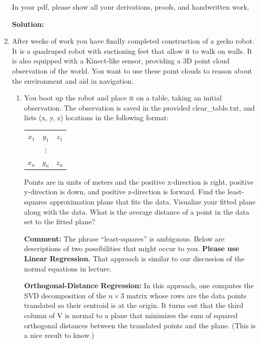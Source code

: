 \documentclass[conference,onecolumn]{IEEEtran}
\begin{document}
\begin{enumerate}[label=\arabic{enumi}.]
            In your pdf, please show all your derivations, proofs, and handwritten work.

            \textbf{Solution:}



            \clearpage
      \item After weeks of work you have finally completed construction of a gecko robot.
            It is a quadruped robot with suctioning feet that allow it to walk on walls.
            It is also equipped with a Kinect-like sensor, providing a 3D point cloud observation of the world.
            You want to use these point clouds to reason about the environment and aid in navigation.
            \begin{enumerate}
                  \item You boot up the robot and place it on a table, taking an initial observation.
                        The observation is saved in the provided clear\_table.txt, and lists (x, y, z) locations in the following format:
                        \begin{table}[H]
                              \centering
                              \begin{tabular}{ccc}
                                    $x_1$ & $y_1$    & $z_1$ \\
                                          & $\vdots$ &       \\
                                    $x_n$ & $y_n$    & $z_n$
                              \end{tabular}
                        \end{table}
                        Points are in units of meters and the positive x-direction is right, positive y-direction is down, and positive z-direction is forward.
                        Find the least-squares approximation plane that fits the data.
                        Visualize your fitted plane along with the data.
                        What is the average distance of a point in the data set to the fitted plane?

                        \textbf{Comment:} The phrase “least-squares” is ambiguous. Below are descriptions of two possibilities that might occur to you.
                        \textbf{Please use Linear Regression.}
                        That approach is similar to our discussion of the normal equations in lecture.

                        \textbf{Orthogonal-Distance Regression:} In this approach, one computes the SVD decomposition of the $n \times 3$ matrix whose rows are the data points translated so their centroid is at the origin.
                        It turns out that the third column of V is normal to a plane that minimizes the sum of squared orthogonal distances between the translated points and the plane.
                        (This is a nice result to know.)


\end{enumerate}
\end{enumerate}
\end{document}
